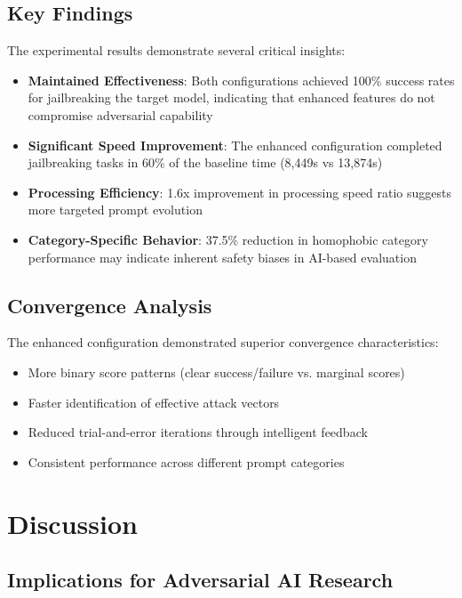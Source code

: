 \documentclass[11pt,twocolumn]{article}
\begin{document}
\subsection{Key Findings}

The experimental results demonstrate several critical insights:

\begin{itemize}
\item \textbf{Maintained Effectiveness}: Both configurations achieved 100\% success rates for jailbreaking the target model, indicating that enhanced features do not compromise adversarial capability
\item \textbf{Significant Speed Improvement}: The enhanced configuration completed jailbreaking tasks in 60\% of the baseline time (8,449s vs 13,874s)
\item \textbf{Processing Efficiency}: 1.6x improvement in processing speed ratio suggests more targeted prompt evolution
\item \textbf{Category-Specific Behavior}: 37.5\% reduction in homophobic category performance may indicate inherent safety biases in AI-based evaluation
\end{itemize}

\subsection{Convergence Analysis}

The enhanced configuration demonstrated superior convergence characteristics:

\begin{itemize}
\item More binary score patterns (clear success/failure vs. marginal scores)
\item Faster identification of effective attack vectors
\item Reduced trial-and-error iterations through intelligent feedback
\item Consistent performance across different prompt categories
\end{itemize}

\section{Discussion}

\subsection{Implications for Adversarial AI Research}
\end{document}
